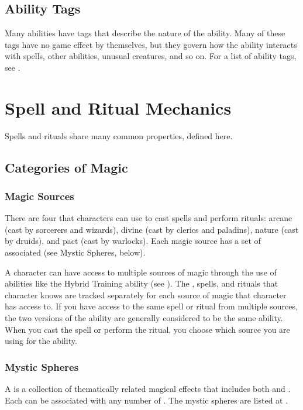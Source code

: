     \subsection{Ability Tags}
        Many abilities have tags that describe the nature of the ability.
        Many of these tags have no game effect by themselves, but they govern how the ability interacts with spells, other abilities, unusual creatures, and so on.
        For a list of ability tags, see .

\section{Spell and Ritual Mechanics}\label{Spell and Ritual Mechanics}

    Spells and rituals share many common properties, defined here.

    \subsection{Categories of Magic}

    \subsubsection{Magic Sources}
        There are four  that characters can use to cast spells and perform rituals: arcane (cast by sorcerers and wizards), divine (cast by clerics and paladins), nature (cast by druids), and pact (cast by warlocks).
        Each magic source has a set of associated  (see Mystic Spheres, below).

            A character can have access to multiple sources of magic through the use of abilities like the Hybrid Training ability (see ).
            The , spells, and rituals that character knows are tracked separately for each source of magic that character has access to.
            If you have access to the same spell or ritual from multiple sources, the two versions of the ability are generally considered to be the same ability.
            When you cast the spell or perform the ritual, you choose which source you are using for the ability.

        \subsubsection{Mystic Spheres}
            A  is a collection of thematically related magical effects that includes both  and .
            Each  can be associated with any number of .
            The mystic spheres are listed at .

